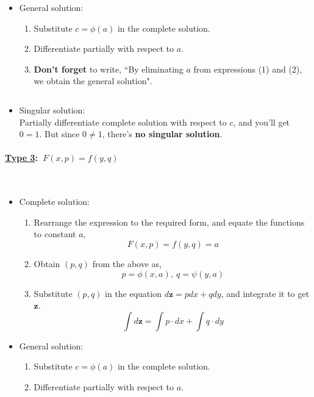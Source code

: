 \documentclass{article}
\newcommand{\para}[1]{\paragraph{#1}\mbox{}\\}
\begin{document}
{\begin{itemize}
\begin{enumerate}[1)]
\newpage
\item Substitute the ``new" $p,q$ in {\LARGE $F(\textbf{z},p,q)=0$}.
\item Rearrange the equation (variable-separable method), and integrate it with the respective $(u,\textbf{z})$, to get the corresponding $f(u,\textbf{z})$.
\item Substitute {\LARGE $u=x+ay$} in the equation, and rearrange it, to obtain the complete solution in the form {\LARGE $\textbf{z}=f(x,y)\\ $}.
\end{enumerate}
\item General solution:
\begin{enumerate}[1)]
\item Substitute {\LARGE $c=\phi(a)$} in the complete solution.
\item Differentiate partially with respect to $a$.
\item \textbf{Don't forget} to write, ``By eliminating {\LARGE $a$} from expressions (1) and (2), we obtain the general solution".
\end{enumerate}
$\ $
\item Singular solution: \\
Partially differentiate complete solution with respect to {\LARGE $c$}, and you'll get {\LARGE $0=1$}. But since {\LARGE $0\neq 1$}, there's \textbf{no singular solution}.
\end{itemize}
\para{{\Large \underline{Type 3}: {\LARGE $\ F(x,p)=f(y,q)$}}}
\begin{itemize}
\item Complete solution:
\begin{enumerate}[1)]
\item Rearrange the expression to the required form, and equate the functions to constant {\LARGE $a$}, {\LARGE $$F(x,p)=f(y,q)=a$$}
\item Obtain $(p,q)$ from the above as, {\LARGE $$p=\phi(x,a),\ q=\psi(y,a)$$}
\item Substitute $(p,q)$ in the equation $d\textbf{z}=pdx+qdy$, and integrate it to get $\textbf{z}$. {\LARGE $$\int d\textbf{z}=\int p\cdot dx+\int q\cdot dy$$}
\end{enumerate}
\item General solution:
\begin{enumerate}[1)]
\item Substitute {\LARGE $c=\phi(a)$} in the complete solution.
\item Differentiate partially with respect to $a$.

\end{enumerate}
\end{itemize}}
\end{document}
